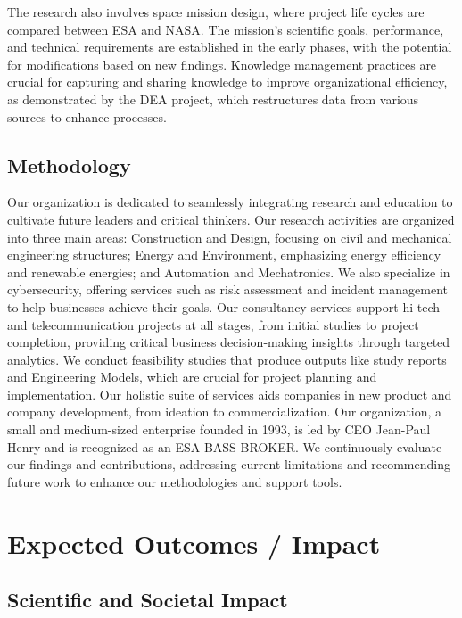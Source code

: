 \documentclass{article}
\begin{document}
The research also involves space mission design, where project life cycles are compared between ESA and NASA. The mission's scientific goals, performance, and technical requirements are established in the early phases, with the potential for modifications based on new findings. Knowledge management practices are crucial for capturing and sharing knowledge to improve organizational efficiency, as demonstrated by the DEA project, which restructures data from various sources to enhance processes.

\subsection{Methodology}

Our organization is dedicated to seamlessly integrating research and education to cultivate future leaders and critical thinkers. Our research activities are organized into three main areas: Construction and Design, focusing on civil and mechanical engineering structures; Energy and Environment, emphasizing energy efficiency and renewable energies; and Automation and Mechatronics. We also specialize in cybersecurity, offering services such as risk assessment and incident management to help businesses achieve their goals. Our consultancy services support hi-tech and telecommunication projects at all stages, from initial studies to project completion, providing critical business decision-making insights through targeted analytics. We conduct feasibility studies that produce outputs like study reports and Engineering Models, which are crucial for project planning and implementation. Our holistic suite of services aids companies in new product and company development, from ideation to commercialization. Our organization, a small and medium-sized enterprise founded in 1993, is led by CEO Jean-Paul Henry and is recognized as an ESA BASS BROKER. We continuously evaluate our findings and contributions, addressing current limitations and recommending future work to enhance our methodologies and support tools.

\section{Expected Outcomes / Impact}

\subsection{Scientific and Societal Impact}
\end{document}

